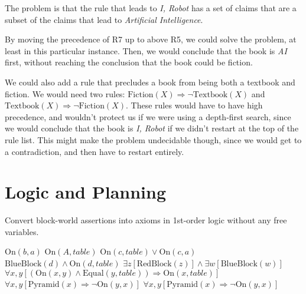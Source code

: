 \documentclass[11pt,largemargins, anonymous]{homework}
\begin{document}
The problem is that the rule that leads to \textit{I, Robot}
has a set of claims that are a subset of the claims that lead to \textit{Artificial Intelligence}.

By moving the precedence of R7 up to above R5, we could solve the problem,
at least in this particular instance.
Then, we would conclude that the book is \textit{AI} first,
without reaching the conclusion that the book could be fiction.

We could also add a rule that precludes a book from being both a textbook and fiction.
We would need two rules: $\mathrm{Fiction}(X) \Rightarrow \neg \mathrm{Textbook}(X)$ and $\mathrm{Textbook}(X) \Rightarrow \neg \mathrm{Fiction}(X)$. These rules would have to have high precedence,
and wouldn't protect us if we were using a depth-first search,
since we would conclude that the book is \textit{I, Robot} if we didn't restart at the top of the rule list.
This might make the problem undecidable though,
since we would get to a contradiction,
and then have to restart entirely.

\clearpage
\maketitle
\clearpage
\part{Logic and Planning}

\question

Convert block-world assertions into axioms in 1st-order logic
without any free variables.

\begin{arabicparts}

    \questionpart \( \mathrm{On}(b, a) \)
    \questionpart \( \mathrm{On}(A, table) \)
    \questionpart \( \mathrm{On}(c, table) \lor \mathrm{On}(c, a) \)
    \questionpart \( \mathrm{BlueBlock}(d) \land \mathrm{On}(d, table) \)
    \questionpart \( \exists z [\mathrm{RedBlock}(z)] \land \exists w [\mathrm{BlueBlock}(w)] \)
    \questionpart \( \forall x, y [(\mathrm{On}(x, y) \land \mathrm{Equal}(y, table)) \Rightarrow \mathrm{On}(x, table)] \)
    \questionpart \( \forall x, y [\mathrm{Pyramid}(x) \Rightarrow  \neg \mathrm{On}(y, x)] \)
    \questionpart \( \forall x, y [\mathrm{Pyramid}(x) \Rightarrow  \neg \mathrm{On}(y, x)] \)

\end{arabicparts}

\question
\end{document}
